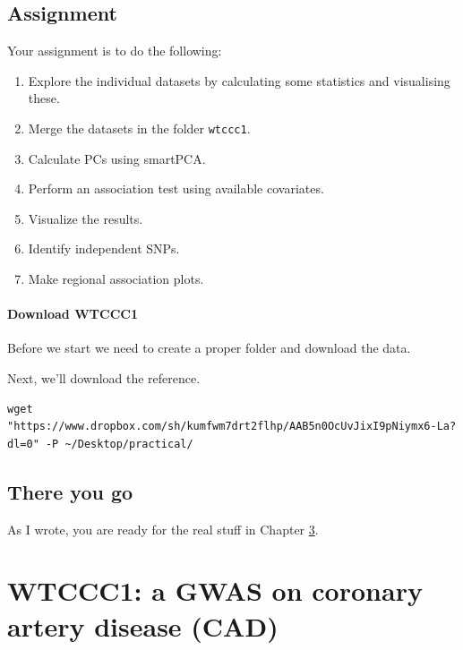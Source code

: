 \documentclass[
]{book}
\newcommand{\passthrough}[1]{#1}
\providecommand{\tightlist}{%
  \setlength{\itemsep}{0pt}\setlength{\parskip}{0pt}}
\begin{document}
\hypertarget{assignment}{%
\section{Assignment}\label{assignment}}

Your assignment is to do the following:

\begin{enumerate}
\def\labelenumi{\arabic{enumi}.}
\tightlist
\item
  Explore the individual datasets by calculating some statistics and visualising these.
\item
  Merge the datasets in the folder \passthrough{\lstinline!wtccc1!}.
\item
  Calculate PCs using smartPCA.
\item
  Perform an association test using available covariates.
\item
  Visualize the results.
\item
  Identify independent SNPs.
\item
  Make regional association plots.
\end{enumerate}

\hypertarget{download-wtccc1}{%
\subsubsection{Download WTCCC1}\label{download-wtccc1}}

Before we start we need to create a proper folder and download the data.

Next, we'll download the reference.

\begin{lstlisting}
wget "https://www.dropbox.com/sh/kumfwm7drt2flhp/AAB5n0OcUvJixI9pNiymx6-La?dl=0" -P ~/Desktop/practical/
\end{lstlisting}

\hypertarget{there-you-go}{%
\section{There you go}\label{there-you-go}}

As I wrote, you are ready for the real stuff in Chapter \ref{wtccc1}.

\hypertarget{wtccc1}{%
\chapter{WTCCC1: a GWAS on coronary artery disease (CAD)}\label{wtccc1}}
\end{document}
